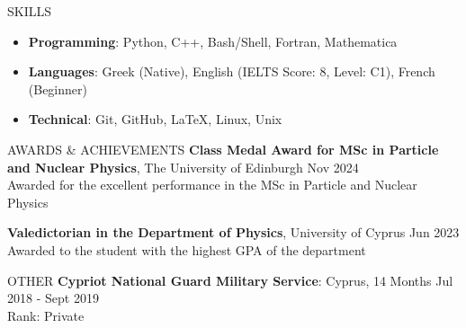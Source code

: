 \documentclass{resume} %
\begin{document}
        \bigbreak

        \begin{rSection}{SKILLS}
                \begin{itemize}
                        \itemsep -3pt {} 
                        \item \textbf{Programming}: Python, C++, Bash/Shell, Fortran, Mathematica
                        \item \textbf{Languages}: Greek (Native), English (IELTS Score: 8, Level: C1), French (Beginner)
                        \item \textbf{Technical}: Git, GitHub, \LaTeX, Linux, Unix
                \end{itemize}
        \end{rSection}

        \bigbreak

        \begin{rSection}{AWARDS \& ACHIEVEMENTS}
                {\bf Class Medal Award for MSc in Particle and Nuclear Physics}, The University of Edinburgh \hfill Nov 2024\\
                Awarded for the excellent performance in the MSc in Particle and Nuclear Physics

                {\bf Valedictorian in the Department of Physics}, University of Cyprus \hfill Jun 2023\\
                Awarded to the student with the highest GPA of the department
                
                
        \end{rSection} 

        \bigbreak

        \begin{rSection}{OTHER}
                {\bf Cypriot National Guard Military Service}: Cyprus, 14 Months \hfill {Jul 2018 - Sept 2019}\\
                Rank: Private
        \end{rSection}

        \bigbreak

\end{document}
